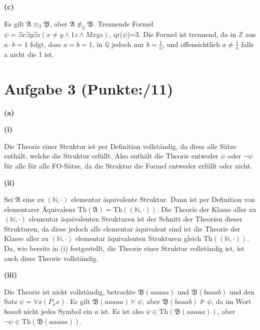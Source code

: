 \documentclass[11pt, a4paper]{article}
\newcommand{\pp}{11}
\newcommand{\struc}[1]{\ensuremath{\mathfrak{#1}}}
\begin{document}
\textbf{(c)}
\begin{adjustwidth}{20pt}{20pt}
	Es gilt $\struc{A} \equiv_2 \struc{B}$, aber $\struc{A} \not\equiv_3 \struc{B}$. Trennende Formel $\psi=\exists x \exists y \exists z(x \neq y \wedge 1z \wedge Mxyz)$, qr($\psi$)=3.
	Die Formel ist trennend, da in $\mathbb{Z}$ aus $a\cdot b=1$ folgt, dass $a=b=1$, in $\mathbb{Q}$ jedoch nur $b = \frac{1}{a}$, und offensichtlich $a \neq \frac{1}{a}$ falls a nicht die 1
	ist.
\end{adjustwidth}


\section*{Aufgabe 3 (Punkte:\qquad/\pp)}
\textbf{(a)}
\begin{adjustwidth}{20pt}{20pt}
\textbf{(i)}
\begin{adjustwidth}{2em}{0em}\vspace{-\baselineskip}
	Die Theorie einer Struktur ist per Definition vollständig, da diese alle Sätze enthält, welche die Struktur erfüllt. Also enthält die Theorie entweder $\psi$ oder $\neg\psi$ für alle
	für alle FO-Sätze, da die Struktur die Formel entweder erfüllt oder nicht.
\end{adjustwidth}
\textbf{(ii)}
\begin{adjustwidth}{2em}{0em}\vspace{-\baselineskip}
	Sei \struc{A} eine zu $(\mathbb{N},\cdot)$ elementar äquivalente Struktur. Dann ist per Definition von elementarer Äquivalenz $\text{Th}(\struc{A})=\text{Th}((\mathbb{N},\cdot))$. Die
	Theorie der Klasse aller zu $(\mathbb{N},\cdot)$ elementar äquivalenten Strukturen ist der Schnitt der Theorien dieser Strukturen, da diese jedoch alle elementar äquivalent sind ist
	die Theorie der Klasse aller zu $(\mathbb{N},\cdot)$ elementar äquivalenten Strukturen gleich $\text{Th}((\mathbb{N},\cdot))$. Da, wie bereits in (i) festgestellt, die Theorie einer
	Struktur vollständig ist, ist auch diese Theorie vollständig.
\end{adjustwidth}
\textbf{(iii)}
\begin{adjustwidth}{2em}{0em}\vspace{-\baselineskip}
	Die Theorie ist nicht vollständig, betrachte $\struc{B}(aaaaa)$ und $\struc{B}(baaab)$ und den Satz $\psi = \forall x(P_ax)$. Es gilt $\struc{B}(aaaaa) \models \psi$, aber 
	$\struc{B}(baaab) \not\models \psi$, da im Wort $baaab$ nicht jedes Symbol ein $a$ ist. Es ist also $\psi \in \text{Th}(\struc{B}(aaaaa))$, aber $\neg\psi \in \text{Th}(\struc{B}(aaaaa))$.

\end{adjustwidth}
\end{adjustwidth}
\end{document}
